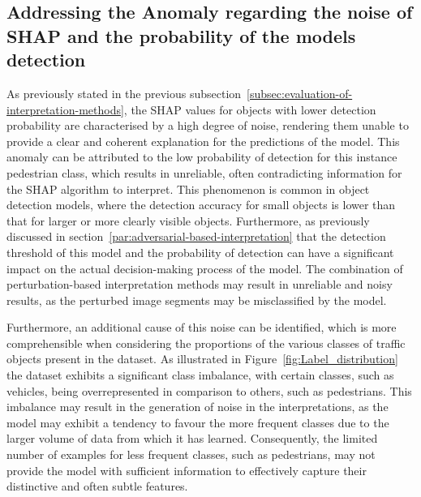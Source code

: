 \subsection{Addressing the Anomaly regarding the noise of SHAP and the probability of the models detection}\label{subsec:Addressing the Anomaly regarding SHAP and the probability of detection}

As previously stated in the previous subsection~\ref{subsec:evaluation-of-interpretation-methods},
the SHAP values for objects with lower detection probability are characterised by a high degree of noise,
rendering them unable to provide a clear and coherent explanation for the predictions of the model.
This anomaly can be attributed to the low probability of detection for this instance pedestrian class, which results in unreliable,
often contradicting information for the SHAP algorithm to interpret.
This phenomenon is common in object detection models, where the detection accuracy for small objects is lower than that for larger or more clearly visible objects.
Furthermore, as previously discussed in section~\ref{par:adversarial-based-interpretation} that the detection threshold of this model and the probability of detection can
have a significant impact on the actual decision-making process of the model.
The combination of perturbation-based interpretation methods may result in unreliable and noisy results, as the perturbed image segments may be misclassified by the model.

Furthermore, an additional cause of this noise can be identified, which is more comprehensible when considering the proportions of the various classes of traffic objects present in the dataset.
As illustrated in Figure~\ref{fig:Label_distribution} the dataset exhibits a significant class imbalance, with certain classes, such as vehicles, being overrepresented in comparison to others, such as pedestrians.
This imbalance may result in the generation of noise in the interpretations, as the model may exhibit a tendency to favour the more frequent classes due to the larger volume of data from which it has learned.
Consequently, the limited number of examples for less frequent classes, such as pedestrians, may not provide the model with sufficient information to effectively capture their distinctive and often subtle features.

